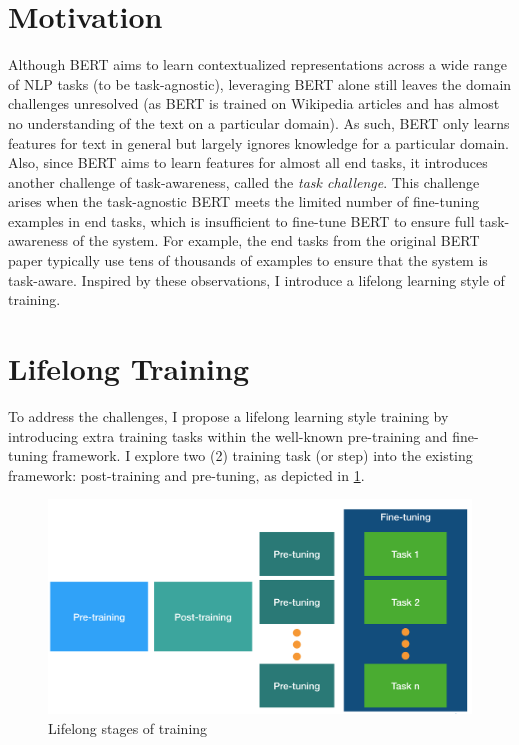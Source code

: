 \section{Motivation}
\label{chap4:sec:motivation}

Although BERT aims to learn contextualized representations across a wide range of NLP tasks (to be task-agnostic), leveraging BERT alone still leaves the domain challenges unresolved (as BERT is trained on Wikipedia articles and has almost no understanding of the text on a particular domain).
As such, BERT only learns features for text in general but largely ignores knowledge for a particular domain.
Also, since BERT aims to learn features for almost all end tasks, it introduces another challenge of task-awareness, called the \textit{task challenge}.
This challenge arises when the task-agnostic BERT meets the limited number of fine-tuning examples in end tasks, which is insufficient to fine-tune BERT to ensure full task-awareness of the system.
For example, the end tasks from the original BERT paper typically use tens of thousands of examples to ensure that the system is task-aware.
Inspired by these observations, I introduce a lifelong learning style of training.

\section{Lifelong Training}

To address the challenges, I propose a lifelong learning style training by introducing extra training tasks within the well-known pre-training and fine-tuning framework.
I explore two (2) training task (or step) into the existing framework: post-training and pre-tuning, as depicted in \ref{chap4:fig:ll_train}.

\begin{figure}
\centering
\includegraphics[width=5.5in]{fig/ll_train.png}
    \caption{Lifelong stages of training}
\label{chap4:fig:ll_train}
\vspace{-3mm}
\end{figure}


